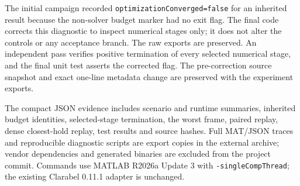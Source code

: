 \documentclass[11pt]{article}
\begin{document}
The initial campaign recorded \texttt{optimizationConverged=false} for an
inherited result because the non-solver budget marker had no exit flag.
The final code corrects this diagnostic to inspect numerical stages only;
it does not alter the controls or any acceptance branch. The raw exports
are preserved. An independent pass verifies positive termination of every
selected numerical stage, and the final unit test asserts the corrected flag.
The pre-correction source snapshot and exact one-line metadata change are
preserved with the experiment exports.

The compact JSON evidence includes scenario and runtime summaries, inherited
budget identities, selected-stage termination, the worst frame, paired replay,
dense closest-hold replay, test results and source hashes. Full MAT/JSON
traces and reproducible diagnostic scripts are export copies in the external
archive; vendor dependencies and generated binaries are excluded from the
project commit. Commands use MATLAB R2026a Update 3 with
\texttt{-singleCompThread}; the existing Clarabel 0.11.1 adapter is unchanged.
\end{document}
